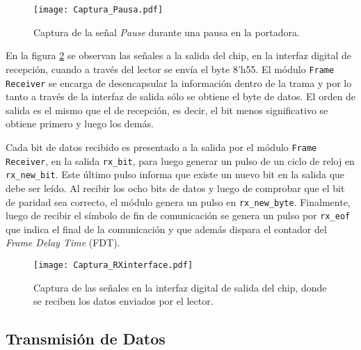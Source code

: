 \begin{figure}
	\centering
	\texttt{[image: Captura\_Pausa.pdf]}
	\caption{Captura de la señal \emph{Pause} durante una pausa en la 
	portadora.}
	\label{fig:CapturaPause}
\end{figure}

En la figura \ref{fig:CapturaRXinterface} se observan las señales a 
la salida del chip, en la interfaz digital de recepción, cuando a 
través del lector se envía el byte 8'h55. El módulo 
\lstinline{Frame Receiver} se encarga de desencapsular la información 
dentro de la trama y por lo tanto a través de la interfaz de salida 
sólo se obtiene el byte de datos. El orden de salida es el mismo que 
el de recepción, es decir, el bit menos significativo se obtiene 
primero y luego los demás. 

Cada bit de datos recibido es presentado a la salida por el módulo 
\lstinline{Frame Receiver}, en la salida \lstinline{rx_bit}, para 
luego generar un pulso de un ciclo de reloj en \lstinline{rx_new_bit}.
Este último pulso informa que existe un nuevo bit en la salida que debe 
ser leído. Al recibir los ocho bits de datos y luego de comprobar que 
el bit de paridad sea correcto, el módulo genera un pulso en 
\lstinline{rx_new_byte}. Finalmente, luego de recibir el símbolo de 
fin de comunicación se genera un pulso por \lstinline{rx_eof} que 
indica el final de la comunicación y que además dispara el contador 
del \emph{Frame Delay Time} (FDT).

\begin{figure}
	\centering
	\texttt{[image: Captura\_RXinterface.pdf]}
	\caption{Captura de las señales en la interfaz digital de salida 
	del chip, donde se reciben los datos enviados por el lector.}
	\label{fig:CapturaRXinterface}
\end{figure}


\subsection{Transmisión de Datos}

